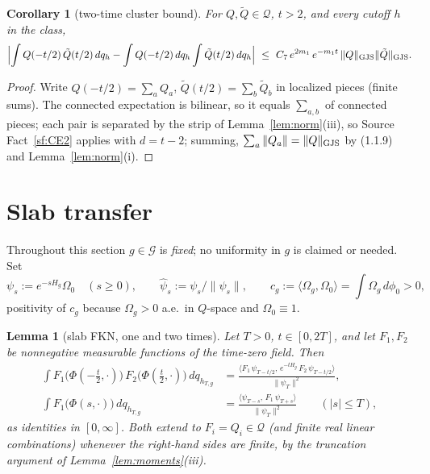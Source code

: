 \documentclass[11pt,a4paper]{article}
\theoremstyle{plain}
\newtheorem{lemma}[theorem]{Lemma}
\newtheorem{corollary}[theorem]{Corollary}
\theoremstyle{definition}
\newcommand{\Om}{\Omega}
\newcommand{\G}{\mathcal{G}}
\newcommand{\Q}{\mathcal{Q}}
\newcommand{\ip}[2]{\langle #1,#2\rangle}
\begin{document}
\begin{corollary}[two-time cluster bound]\label{cor:cluster}
For $Q,\tilde Q\in\Q$, $t>2$, and every cutoff $h$ in the class,
\[
  \Bigl|\int Q(-t/2)\,\tilde Q(t/2)\,dq_h
  -\int Q(-t/2)\,dq_h\int \tilde Q(t/2)\,dq_h\Bigr|
  \ \le\ C_7\,e^{2m_1}\,e^{-m_1t}\,\|Q\|_{\rm GJS}\|\tilde Q\|_{\rm GJS} .
\]
\end{corollary}

\begin{proof}
Write $Q(-t/2)=\sum_aQ_a$, $\tilde Q(t/2)=\sum_b\tilde Q_b$ in localized pieces (finite sums).
The connected expectation is bilinear, so it equals $\sum_{a,b}$ of connected pieces; each pair is
separated by the strip of Lemma~\ref{lem:norm}(iii), so Source Fact~\ref{sf:CE2} applies with
$d=t-2$; summing, $\sum_a\|Q_a\|=\|Q\|_{\rm GJS}$ by (1.1.9) and Lemma~\ref{lem:norm}(i).
\end{proof}

\section{Slab transfer}\label{sec:slab}

Throughout this section $g\in\G$ is \emph{fixed}; no uniformity in $g$ is claimed or needed. Set
\[
  \psi_s:=e^{-sH_g}\Om_0\quad(s\ge0),\qquad \hat\psi_s:=\psi_s/\|\psi_s\|,\qquad
  c_g:=\ip{\Om_g}{\Om_0}=\int\Om_g\,d\phi_0>0 ,
\]
positivity of $c_g$ because $\Om_g>0$ a.e.\ in $Q$-space and $\Om_0\equiv1$.

\begin{lemma}[slab FKN, one and two times]\label{lem:FKN}
Let $T>0$, $t\in[0,2T]$, and let $F_1,F_2$ be nonnegative measurable functions of the time-zero
field. Then
\begin{align}
  \int F_1\bigl(\Phi(-\tfrac t2,\cdot)\bigr)\,F_2\bigl(\Phi(\tfrac t2,\cdot)\bigr)\,dq_{h_{T,g}}
  &=\frac{\ip{F_1\,\psi_{T-t/2}}{\,e^{-tH_g}\,F_2\,\psi_{T-t/2}}}{\|\psi_T\|^2},
  \label{eq:FKN2}\\
  \int F_1\bigl(\Phi(s,\cdot)\bigr)\,dq_{h_{T,g}}
  &=\frac{\ip{\psi_{T-s}}{\,F_1\,\psi_{T+s}}}{\|\psi_T\|^2}\qquad(|s|\le T),
  \label{eq:FKN1}
\end{align}
as identities in $[0,\infty]$. Both extend to $F_i=Q_i\in\Q$ (and finite real linear combinations)
whenever the right-hand sides are finite, by the truncation argument of
Lemma~\ref{lem:moments}\textup{(iii)}.
\end{lemma}
\end{document}
